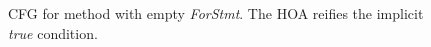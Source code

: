 \begin{figure}
\hspace{-0.5cm}
 \scalebox{0.55}{
 	
 }
\caption{CFG for method with empty \emph{ForStmt}. The HOA  reifies the implicit \emph{true} condition.
}
\label{fig:ForStmt}
\end{figure}



